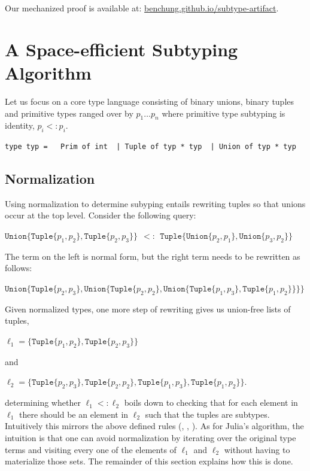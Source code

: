 \documentclass[a4paper,english]{lipics-v2019}
\newcommand{\xt}[1]{\texttt{#1}}
\newcommand{\union}[2]{\xt{Union\{}#1,#2\xt{\}}}
\newcommand{\tuple}[1]{\xt{Tuple\{}#1\xt{\}}}
\begin{document}
\medskip
Our mechanized proof is available at: {\small\url{benchung.github.io/subtype-artifact}}.

\section{A Space-efficient Subtyping Algorithm}

Let us focus on a core type language consisting of binary unions, binary
tuples and primitive types ranged over by $p_1 \dots p_n$ where primitive
type subtyping is identity, $p_i <: p_i$.

\medskip
\begin{lstlisting}
type typ =   Prim of int  | Tuple of typ * typ  | Union of typ * typ
\end{lstlisting}
\medskip

\subsection{Normalization}\label{normalize}

Using normalization to determine subyping entails rewriting tuples so that
unions occur at the top level. Consider the following query:

\medskip
$\union{ \tuple{p_1,p_2}}{\tuple{p_2,p_3}} ~~ <:~~  \tuple{ \union{p_2}{p_1}, \union{p_3}{p_2}}$
\medskip

\noindent
The term on the left is normal form, but the right term  needs to be
rewritten as follows:

\medskip
$\union{ \tuple{p_2,p_3}}
  {\union{ \tuple{p_2,p_2}}
    {\union{ \tuple{p_1,p_3}}
           {\tuple{p_1,p_2}}}}$
\medskip

\noindent
Given normalized types, one more step of rewriting gives us union-free
lists of tuples,

\medskip
$\ell_1 = \{  \tuple{p_1,p_2}, \tuple{p_2,p_3}  \}$
\medskip

\noindent and

\medskip
$\ell_2 = \{  \tuple{p_2,p_3}, \tuple{p_2,p_2}, \tuple{p_1,p_3}, 
          \tuple{p_1,p_2} \}$.
\medskip

\noindent determining whether $\ell_1 <: \ell_2$ boils down to checking that
for each element in $\ell_1$ there should be an element in $\ell_2$ such
that the tuples are subtypes. Intuitively this mirrors the above defined
rules ({\sc [allexist]}, {\sc [existL/R]}, {\sc [tuple]}). As for Julia's
algorithm, the intuition is that one can avoid normalization by iterating
over the original type terms and visiting every one of the elements of
$\ell_1$ and $\ell_2$ without having to materialize those sets. The
remainder of this section explains how this is done.
\end{document}
